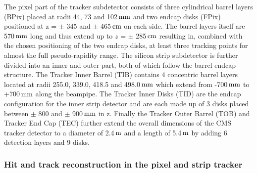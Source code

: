 The pixel part of the tracker subdetector consists of three cylindrical barrel layers (BPix) placed at radii 44, 73 and 102$\, \mathrm{mm}$ and two endcap disks (FPix) positioned at z = $\pm$ 345 and $\pm$ 465$\, \mathrm{cm}$ on each side. The barrel layers itself are 570$\, \mathrm{mm}$ long and thus extend up to $z$ = $\pm$ 285$\, \mathrm{cm}$ resulting in, combined with the chosen positioning of the two endcap disks, at least three tracking points for almost the full pseudo-rapidity range. The silicon strip subdetector is further divided into an inner and outer part, both of which follow the barrel-endcap structure. The Tracker Inner Barrel (TIB) contains 4 concentric barrel layers located at radii 255.0, 339.0, 418.5 and 498.0$\, \mathrm{mm}$ which extend from -700$\, \mathrm{mm}$ to +700$\, \mathrm{mm}$ along the beampipe. The Tracker Inner Disks (TID) are the endcap configuration for the inner strip detector and are each made up of 3 disks placed between $\pm$ 800 and $\pm$ 900$\, \mathrm{mm}$ in z. Finally the Tracker Outer Barrel (TOB) and Tracker End Cap (TEC) further extend the overall dimensions of the CMS tracker detector to a diameter of 2.4$\, \mathrm{m}$ and a length of 5.4$\, \mathrm{m}$ by adding 6 detection layers and 9 disks.

\subsubsection*{Hit and track reconstruction in the pixel and strip tracker}

